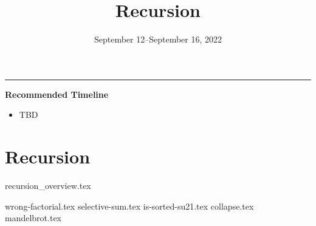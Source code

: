 \documentclass{exam}
\title{Recursion}
\date{September 12--September 16, 2022}
\begin{document}
\maketitle
\rule{\textwidth}{0.15em}
\fontsize{12}{15}\selectfont

\begin{meta}
\textbf{Recommended Timeline}
\begin{itemize}
    \item TBD
\end{itemize}
\end{meta}

\section{Recursion}
{recursion_overview.tex}
\begin{questions}
    {wrong-factorial.tex}
    {selective-sum.tex}
    {is-sorted-su21.tex}
    {collapse.tex}
    {mandelbrot.tex}
\end{questions}
\end{document}
